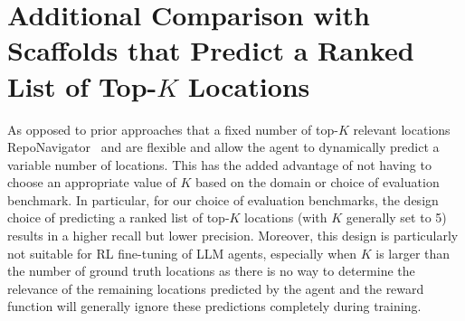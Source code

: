 \section{Additional Comparison with Scaffolds that Predict a Ranked List of Top-$K$ Locations}\label{appendix:topk_discussion}
As opposed to prior approaches that a fixed number of top-$K$ relevant locations RepoNavigator~\citep{zhang2025one} and \methodname are flexible and allow the agent to dynamically predict a variable number of locations. This has the added advantage of not having to choose an appropriate value of $K$ based on the domain or choice of evaluation benchmark. In particular, for our choice of evaluation benchmarks, the design choice of predicting a ranked list of top-$K$ locations (with $K$ generally set to 5) results in a higher recall but lower precision. Moreover, this design is particularly not suitable for RL fine-tuning of LLM agents, especially when $K$ is larger than the number of ground truth locations as there is no way to determine the relevance of the remaining locations predicted by the agent and the reward function will generally ignore these predictions completely during training.

